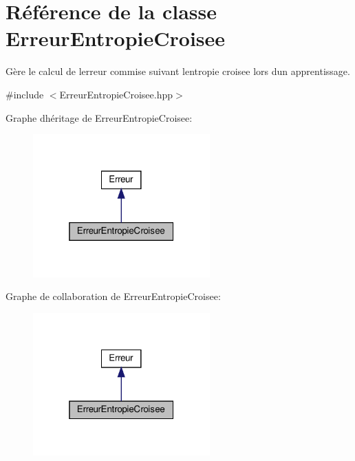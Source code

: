 \hypertarget{class_erreur_entropie_croisee}{}\section{Référence de la classe Erreur\+Entropie\+Croisee}
\label{class_erreur_entropie_croisee}


Gère le calcul de l\textquotesingle{}erreur commise suivant l\textquotesingle{}entropie croisee lors d\textquotesingle{}un apprentissage.  




{\ttfamily \#include $<$Erreur\+Entropie\+Croisee.\+hpp$>$}



Graphe d\textquotesingle{}héritage de Erreur\+Entropie\+Croisee\+:\nopagebreak
\begin{figure}[H]
\begin{center}
\leavevmode
\includegraphics[width=193pt]{class_erreur_entropie_croisee__inherit__graph}
\end{center}
\end{figure}


Graphe de collaboration de Erreur\+Entropie\+Croisee\+:\nopagebreak
\begin{figure}[H]
\begin{center}
\leavevmode
\includegraphics[width=193pt]{class_erreur_entropie_croisee__coll__graph}
\end{center}
\end{figure}
